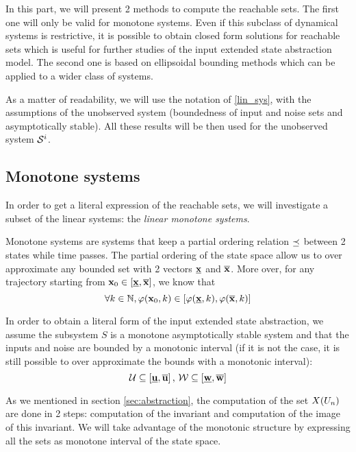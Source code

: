 In this part, we will present 2 methods to compute the reachable sets.
The first one will only be valid for monotone systems. Even if this subclass of dynamical systems is restrictive, it is possible to obtain closed form solutions for reachable sets which is useful for further studies of the input extended state abstraction model.
The second one is based on ellipsoidal bounding methods which can be applied to a wider class of systems.


As a matter of readability, we will use the notation of \ref{lin_sys}, with the assumptions of the unobserved system (boundedness of input and noise sets and asymptotically stable).
All these results will be then used for the unobserved system $\mathcal{S}^i$.

\subsection{Monotone systems}
In order to get a literal expression of the reachable sets, we will investigate a subset of the linear systems: the \textit{linear monotone systems}.


Monotone systems are systems that keep a partial ordering relation $\preceq$ between 2 states while time passes.
The partial ordering of the state space allow us to over approximate any bounded set with 2 vectors $\underline{ \mathbf{x}}$ and $\overline{ \mathbf{x}}$.
More over, for any trajectory starting from $ \mathbf{x}_0 \in [\underline{ \mathbf{x}},\overline{ \mathbf{x}}]$, we know that
\begin{equation}
\forall k \in \mathbb{N}, \varphi( \mathbf{x}_0,k) \in [\varphi(\underline{ \mathbf{x}},k),\varphi(\overline{ \mathbf{x}},k)]
\end{equation}

In order to obtain a literal form of the input extended state abstraction, we assume the subsystem $S$ is a monotone asymptotically stable system and that the inputs and noise are bounded by a monotonic interval (if it is not the case, it is still possible to over approximate the bounds with a monotonic interval):
\begin{equation*}
\mathcal{U} \subseteq \left [ \underline{ \mathbf{u}}, \overline{ \mathbf{u}} \right ]
\textrm{, }
\mathcal{W} \subseteq \left [ \underline{ \mathbf{w}}, \overline{ \mathbf{w}} \right ]
\end{equation*}

As we mentioned in section \ref{sec:abstraction}, the computation of the set $X(U_n)$ are done in 2 steps: computation of the invariant and computation of the image of this invariant.
We will take advantage of the monotonic structure by expressing all the sets as monotone interval of the state space.

